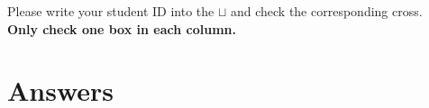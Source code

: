 \documentclass[english,a4paper,oneside]{sdaps}
\begin{document}
    \begin{questionnaire}[noinfo]       %


         \begin{choicegroup}{Please write your student ID into the $\sqcup$
      and check the corresponding cross.\\ \textbf{Only check one box in each
      column.}}
            \groupaddchoice{\Huge$\sqcup$}
            \groupaddchoice{\Huge$\sqcup$}
            \groupaddchoice{\Huge$\sqcup$}

         \end{choicegroup}


        \section{Answers}

        \hspace{0.1\textwidth}%
        \begin{minipage}{0.3\textwidth}

            \begin{choicegroup}{}



            \end{choicegroup}


\end{minipage}
\end{questionnaire}
\end{document}
